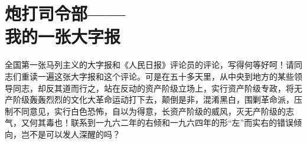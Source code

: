 \section[炮打司令部——我的一张大字报（一九六六年八月五日）]{炮打司令部——\\我的一张大字报}


全国第一张马列主义的大字报和《人民日报》评论员的评论，写得何等好呵！请同志们重读一遍这张大字报和这个评论。可是在五十多天里，从中央到地方的某些领导同志，却反其道而行之，站在反动的资产阶级立场上，实行资产阶级专政，将无产阶级轰轰烈烈的文化大革命运动打下去，颠倒是非，混淆黑白，围剿革命派，压制不同意见，实行白色恐怖，自以为得意，长资产阶级的威风，灭无产阶级的志气，又何其毒也！联系到一九六二年的右倾和一九六四年的形“左”而实右的错误倾向，岂不是可以发人深醒的吗？



